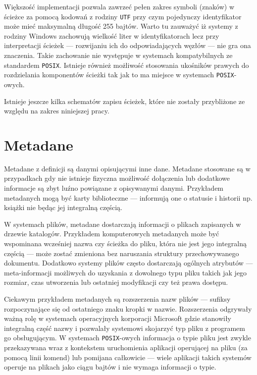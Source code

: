 \par
Większość implementacji pozwala zawrzeć pełen zakres symboli (znaków) w ścieżce za pomocą kodowań z rodziny \texttt{UTF} przy czym pojedynczy identyfikator może mieć maksymalną długość 255 bajtów.
Warto tu zauważyć iż systemy z rodziny Windows zachowują wielkość liter w identyfikatorach lecz przy interpretacji ścieżek --- rozwijaniu ich do odpowiadających węzłów --- nie gra ona znaczenia. Takie zachowanie nie występuje w systemach kompatybilnych ze standardem \texttt{POSIX}. Istnieje również możliwość stosowania ukośników prawych do rozdzielania komponentów ścieżki tak jak to ma miejsce w systemach \texttt{POSIX}-owych.

\par
Istnieje jeszcze kilka schematów zapisu ścieżek, które nie zostały przybliżone ze względu na zakres niniejszej pracy.

\clearpage

\section{Metadane}
\par
Metadane z definicji są danymi opisującymi inne dane. Metadane stosowane są w przypadkach gdy nie istnieje fizyczna możliwość dołączenia lub dodatkowe informacje są zbyt luźno powiązane z opisywanymi danymi.
Przykładem metadanych mogą być karty biblioteczne --- informują one o statusie i historii np. książki nie będąc jej integralną częścią.

\par
W systemach plików, metadane dostarczają informacji o plikach zapisanych w drzewie katalogów.
Przykładem komputerowych metadanych może być wspominana wcześniej nazwa czy ścieżka do pliku, która nie jest jego integralną częścią --- może zostać zmieniona bez naruszania struktury przechowywanego dokumentu.
Dodatkowo systemy plików często dostarczają ogólnych atrybutów --- meta-informacji możliwych do uzyskania z dowolnego typu pliku takich jak jego rozmiar, czas utworzenia lub ostatniej modyfikacji czy też prawa dostępu.
\par
Ciekawym przykładem metadanych są rozszerzenia nazw plików --- sufiksy rozpoczynające się od ostatniego znaku kropki w nazwie. Rozszerzenia odgrywały ważną rolę w systemach operacyjnych korporacji Microsoft gdzie stanowiły integralną część nazwy i pozwalały systemowi skojarzyć typ pliku z programem go obsługującym. W systemach \texttt{POSIX}-owych informacja o typie pliku jest zwykle przekazywana wraz z kontekstem uruchomienia aplikacji operującej na pliku (za pomocą linii komend) lub pomijana całkowicie --- wiele aplikacji takich systemów operuje na plikach jako ciągu bajtów i nie wymaga informacji o typie.


